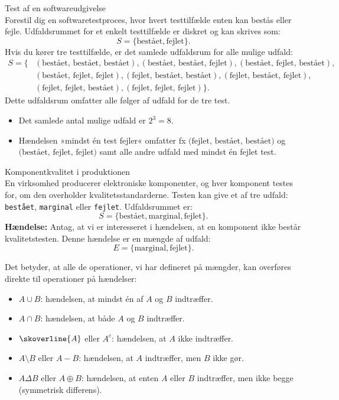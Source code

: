 \begin{example} Test af en softwareudgivelse \\
    Forestil dig en softwaretestproces, hvor hvert testtilfælde enten kan bestås eller fejle. Udfaldsrummet for et enkelt testtilfælde er diskret og kan skrives som:
    \[
    S = \{\text{bestået}, \text{fejlet}\}.
    \]
    Hvis du kører tre testtilfælde, er det samlede udfaldsrum for alle mulige udfald:
    \begin{align*}
    S = \{&(\text{bestået, bestået, bestået}), (\text{bestået, bestået, fejlet}), (\text{bestået, fejlet, bestået}), \\
    &(\text{bestået, fejlet, fejlet}), (\text{fejlet, bestået, bestået}), (\text{fejlet, bestået, fejlet}), \\
    &(\text{fejlet, fejlet, bestået}), (\text{fejlet, fejlet, fejlet})\}.
    \end{align*}
    Dette udfaldsrum omfatter alle følger af udfald for de tre test.
    
    \begin{itemize}
        \item Det samlede antal mulige udfald er \( 2^3 = 8 \).
        \item Hændelsen »mindst én test fejler« omfatter fx \(\text{(fejlet, bestået, bestået)}\) og \(\text{(bestået, fejlet, fejlet)}\) samt alle andre udfald med mindst én fejlet test.
    \end{itemize}
    
    \end{example}
    

\begin{example} Komponentkvalitet i produktionen \\
En virksomhed producerer elektroniske komponenter, og hver komponent testes for, om den overholder kvalitetsstandarderne. Testen kan give et af tre udfald: \texttt{bestået}, \texttt{marginal} eller \texttt{fejlet}. Udfaldsrummet er:
\[
S = \{\text{bestået}, \text{marginal}, \text{fejlet}\}.
\]
\textbf{Hændelse:} Antag, at vi er interesseret i hændelsen, at en komponent ikke består kvalitetstesten. Denne hændelse er en mængde af udfald:
\[
E = \{\text{marginal}, \text{fejlet}\}.
\]
\end{example}

Det betyder, at alle de operationer, vi har defineret på mængder, kan overføres direkte til operationer på hændelser:
\begin{itemize}
    \item $A \cup B$: hændelsen, at mindst én af $A$ og $B$ indtræffer.
    \item $A \cap B$: hændelsen, at både $A$ og $B$ indtræffer.
    \item $\skoverline{A}$ eller $A^c$: hændelsen, at $A$ ikke indtræffer.
    \item $A \setminus B$ eller $A - B$: hændelsen, at $A$ indtræffer, men $B$ ikke gør.
    \item $A \Delta B$ eller $A \oplus B$: hændelsen, at enten $A$ eller $B$ indtræffer, men ikke begge (symmetrisk differens).
\end{itemize}

